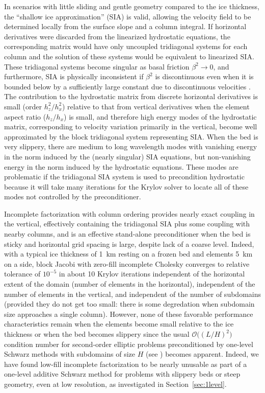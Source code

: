 \documentclass[final]{siamltex}
\newcommand{\citep}[1]{{\cite{#1}}}
\newcommand{\bigO}{{\mathcal{O}}}
\begin{document}
In scenarios with little sliding and gentle geometry compared to the ice thickness, the ``shallow ice approximation'' (SIA) is valid, allowing the velocity field to be determined locally from the surface slope and a column integral.
If horizontal derivatives were discarded from the linearized hydrostatic equations, the corresponding matrix would have only uncoupled tridiagonal systems for each column and the solution of these systems would be equivalent to linearized SIA.
These tridiagonal systems become singular as basal friction $\beta^2 \to 0$, and furthermore, SIA is physically inconsistent if $\beta^2$ is discontinuous even when it is bounded below by a sufficiently large constant due to discontinuous velocities \citep{fowler2001modelling}.
The contribution to the hydrostatic matrix from discrete horizontal derivatives is small (order $h_z^2/h_x^2$) relative to that from vertical derivatives when the element aspect ratio ($h_z/h_x$) is small, and therefore high energy modes of the hydrostatic matrix, corresponding to velocity variation primarily in the vertical, become well approximated by the block tridiagonal system representing SIA.
When the bed is very slippery, there are medium to long wavelength modes with vanishing energy in the norm induced by the (nearly singular) SIA equations, but non-vanishing energy in the norm induced by the hydrostatic equations.
These modes are problematic if the tridiagonal SIA system is used to precondition hydrostatic because it will take many iterations for the Krylov solver to locate all of these modes not controlled by the preconditioner.

Incomplete factorization with column ordering provides nearly exact coupling in the vertical, effectively containing the tridiagonal SIA plus some coupling with nearby columns, and is an effective stand-alone preconditioner when the bed is sticky and horizontal grid spacing is large, despite lack of a coarse level.
Indeed, with a typical ice thickness of \SI{1}{\kilo\metre} resting on a frozen bed and elements \SI{5}{\kilo\metre} on
a side, block Jacobi with zero-fill incomplete Cholesky converges to relative tolerance of $10^{-5}$
in about 10 Krylov iterations independent of the horizontal extent of the domain (number of elements
in the horizontal), independent of the number of elements in the vertical, and independent of the
number of subdomains (provided they do not get too small: there is some degredation when subdomain
size approaches a single column).  However, none of these favorable performance characteristics
remain when the elements become small relative to the ice thickness or when the bed becomes
slippery since the usual $\bigO\big((L/H)^2\big)$ condition number for second-order elliptic problems
preconditioned by one-level Schwarz methods with subdomains of size $H$ (see \cite{smith1996domain}) becomes apparent.
Indeed, we have found low-fill incomplete factorization to be nearly unusable as part of a one-level additive Schwarz method for problems with slippery beds or steep geometry, even at low resolution, as investigated in Section~\ref{sec:1level}.
\end{document}
